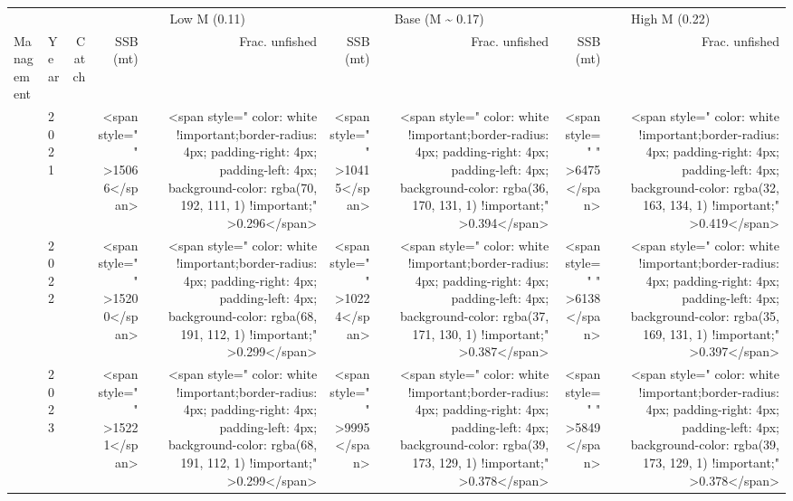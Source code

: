 \begin{table}
\centering
\begin{tabular}[t]{>{}l|l>{}rr>{}r|rrrr}
\toprule
\multicolumn{1}{c}{ } & \multicolumn{1}{c}{ } & \multicolumn{1}{c}{ } & \multicolumn{2}{c}{Low M (0.11)} & \multicolumn{2}{c}{Base (M \textasciitilde{} 0.17)} & \multicolumn{2}{c}{High M (0.22)} \\
\cmidrule(l{3pt}r{3pt}){4-5} \cmidrule(l{3pt}r{3pt}){6-7} \cmidrule(l{3pt}r{3pt}){8-9}
Management & Year & Catch & SSB   (mt) & Frac. unfished & SSB   (mt) & Frac. unfished & SSB   (mt) & Frac. unfished\\
\midrule
 & 2021 & \cellcolor[HTML]{858379}{\textcolor{white}{700}} & <span style="     " >15066</span> & <span style="     color: white !important;border-radius: 4px; padding-right: 4px; padding-left: 4px; background-color: rgba(70, 192, 111, 1) !important;" >0.296</span> & <span style="     " >10415</span> & <span style="     color: white !important;border-radius: 4px; padding-right: 4px; padding-left: 4px; background-color: rgba(36, 170, 131, 1) !important;" >0.394</span> & <span style="     " >6475</span> & <span style="     color: white !important;border-radius: 4px; padding-right: 4px; padding-left: 4px; background-color: rgba(32, 163, 134, 1) !important;" >0.419</span>\\

 & 2022 & \cellcolor[HTML]{858379}{\textcolor{white}{700}} & <span style="     " >15200</span> & <span style="     color: white !important;border-radius: 4px; padding-right: 4px; padding-left: 4px; background-color: rgba(68, 191, 112, 1) !important;" >0.299</span> & <span style="     " >10224</span> & <span style="     color: white !important;border-radius: 4px; padding-right: 4px; padding-left: 4px; background-color: rgba(37, 171, 130, 1) !important;" >0.387</span> & <span style="     " >6138</span> & <span style="     color: white !important;border-radius: 4px; padding-right: 4px; padding-left: 4px; background-color: rgba(35, 169, 131, 1) !important;" >0.397</span>\\

 & 2023 & \cellcolor[HTML]{858379}{\textcolor{white}{700}} & <span style="     " >15221</span> & <span style="     color: white !important;border-radius: 4px; padding-right: 4px; padding-left: 4px; background-color: rgba(68, 191, 112, 1) !important;" >0.299</span> & <span style="     " >9995</span> & <span style="     color: white !important;border-radius: 4px; padding-right: 4px; padding-left: 4px; background-color: rgba(39, 173, 129, 1) !important;" >0.378</span> & <span style="     " >5849</span> & <span style="     color: white !important;border-radius: 4px; padding-right: 4px; padding-left: 4px; background-color: rgba(39, 173, 129, 1) !important;" >0.378</span>\\


\end{tabular}
\end{table}
